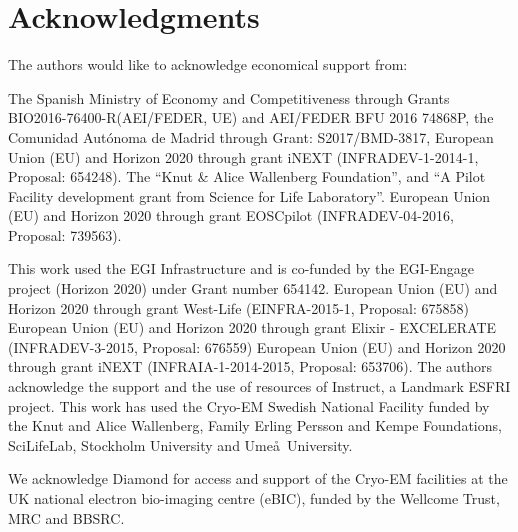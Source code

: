 \section{Acknowledgments}

The authors would like to acknowledge economical support from:

The Spanish Ministry of Economy and Competitiveness through Grants BIO2016-76400-R(AEI/FEDER, UE) and AEI/FEDER BFU 2016 74868P, the Comunidad Aut\'{o}noma de Madrid through Grant: S2017/BMD-3817, European Union (EU) and Horizon 2020 through grant iNEXT (INFRADEV-1-2014-1, Proposal: 654248). The ``Knut \& Alice Wallenberg Foundation'', and ``A Pilot Facility development grant from Science for Life Laboratory''. European Union (EU) and Horizon 2020 through grant EOSCpilot (INFRADEV-04-2016, Proposal: 739563).

This work used the EGI Infrastructure and is co-funded by the EGI-Engage project (Horizon 2020) under Grant number 654142. European Union (EU) and Horizon 2020 through grant West-Life (EINFRA-2015-1, Proposal: 675858) European Union (EU) and Horizon 2020 through grant Elixir - EXCELERATE (INFRADEV-3-2015, Proposal: 676559) European Union (EU) and Horizon 2020 through grant iNEXT (INFRAIA-1-2014-2015, Proposal: 653706). The authors acknowledge the support and the use of resources of Instruct, a Landmark ESFRI project. This work has used the Cryo-EM Swedish National Facility funded by the Knut and Alice Wallenberg, Family Erling Persson and Kempe Foundations, SciLifeLab, Stockholm University and Ume\aa\ University.

We acknowledge Diamond for access and support of the Cryo-EM facilities at the UK national electron bio-imaging centre (eBIC), funded by the Wellcome Trust, MRC and BBSRC.





